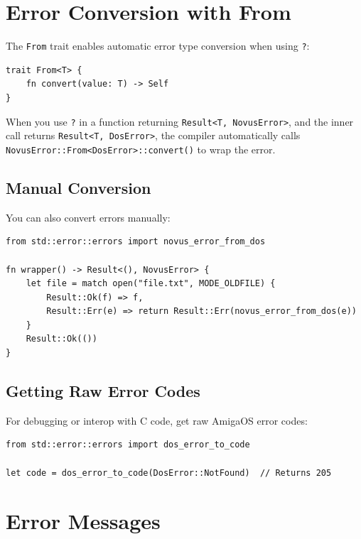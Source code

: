 \section{Error Conversion with From}
\label{sec:error-conversion}

The \texttt{From} trait enables automatic error type conversion when using \texttt{?}:

\begin{lstlisting}
trait From<T> {
    fn convert(value: T) -> Self
}
\end{lstlisting}

When you use \texttt{?} in a function returning \texttt{Result<T, NovusError>}, and the inner call returns \texttt{Result<T, DosError>}, the compiler automatically calls \texttt{NovusError::From<DosError>::convert()} to wrap the error.

\subsection{Manual Conversion}

You can also convert errors manually:

\begin{lstlisting}
from std::error::errors import novus_error_from_dos

fn wrapper() -> Result<(), NovusError> {
    let file = match open("file.txt", MODE_OLDFILE) {
        Result::Ok(f) => f,
        Result::Err(e) => return Result::Err(novus_error_from_dos(e))
    }
    Result::Ok(())
}
\end{lstlisting}

\subsection{Getting Raw Error Codes}

For debugging or interop with C code, get raw AmigaOS error codes:

\begin{lstlisting}
from std::error::errors import dos_error_to_code

let code = dos_error_to_code(DosError::NotFound)  // Returns 205
\end{lstlisting}

\section{Error Messages}
\label{sec:error-messages}

